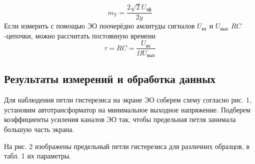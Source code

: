 \documentclass[12pt,a4paper]{article}
\begin{document}
\begin{equation}
    m_Y = \dfrac{2\sqrt{2}U_\text{эф}}{2y}
\end{equation}
Если измерить с помощью ЭО поочерёдно амлитуды сигналов $U_\text{вх}$ и $U_\text{вых}$ $RC$-цепочки, можно рассчитать постоянную времени 
\begin{equation}
    \tau = RC = \dfrac{U_\text{вх}}{\Omega U_\text{вых}}     
\end{equation}



\subsection*{Результаты измерений и обработка данных}
Для наблюдения петли гистерезиса на экране ЭО соберем схему согласно рис. 1, установим автотрансформатор на минимальное выходное напряжение.
Подберем коэффициенты усиления каналов ЭО так, чтобы предельная петля занимала большую часть экрана.

На рис. 2 изображены предельный петли гистерезиса для различних образцов, в табл. 1 их параметры.
\end{document}
